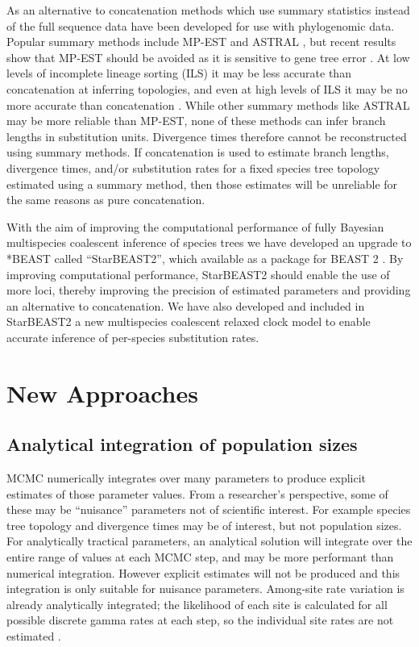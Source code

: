 \documentclass[12pt]{article}
\begin{document}
As an alternative to concatenation methods which use summary statistics instead
of the full sequence data have been developed for use with phylogenomic data.
Popular summary methods include MP-EST and ASTRAL \citep{Liu2010,
Mirarab01092014}, but recent results show that MP-EST should be avoided as it is
sensitive to gene tree error \citep{Mirarab15062015, Xi201563}. At low levels of
incomplete lineage sorting (ILS) it may be less accurate than concatenation at
inferring topologies, and even at high levels of ILS it may be no more accurate
than concatenation \citep{Ogilvie01052016}. While other summary methods like
ASTRAL may be more reliable than MP-EST, none of these methods can infer branch
lengths in substitution units. Divergence times therefore cannot be
reconstructed using summary methods. If concatenation is used to estimate branch
lengths, divergence times, and/or substitution rates for a fixed species tree
topology estimated using a summary method, then those estimates will be
unreliable for the same reasons as pure concatenation.

With the aim of improving the computational performance of fully Bayesian
multispecies coalescent inference of species trees we have developed an upgrade
to *BEAST called ``StarBEAST2'', which available as a package for BEAST 2
\citep{10.1371/journal.pcbi.1003537}. By improving computational performance,
StarBEAST2 should enable the use of more loci, thereby improving the precision
of estimated parameters and providing an alternative to concatenation. We have
also developed and included in StarBEAST2 a new multispecies coalescent relaxed
clock model to enable accurate inference of per-species substitution rates.

\section*{New Approaches}

\subsection*{Analytical integration of population sizes}

MCMC numerically integrates over many parameters to produce explicit estimates
of those parameter values. From a researcher's perspective, some of these may be
``nuisance'' parameters not of scientific interest. For example species tree
topology and divergence times may be of interest, but not population sizes. For
analytically tractical parameters, an analytical solution will integrate over
the entire range of values at each MCMC step, and may be more performant than
numerical integration. However explicit estimates will not be produced and this
integration is only suitable for nuisance parameters. Among-site rate variation
is already analytically integrated; the likelihood of each site is calculated
for all possible discrete gamma rates at each step, so the individual site rates
are not estimated \citep{Yang1994}.
\end{document}
